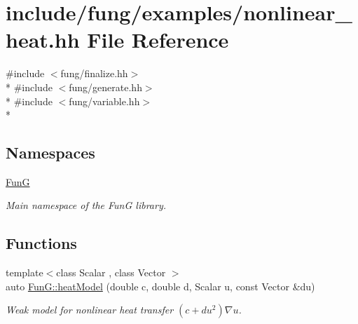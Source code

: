 \hypertarget{nonlinear__heat_8hh}{\section{include/fung/examples/nonlinear\-\_\-heat.hh File Reference}
\label{nonlinear__heat_8hh}
}
{\ttfamily \#include $<$fung/finalize.\-hh$>$}\\*
{\ttfamily \#include $<$fung/generate.\-hh$>$}\\*
{\ttfamily \#include $<$fung/variable.\-hh$>$}\\*
\subsection*{Namespaces}
\begin{DoxyCompactItemize}
\item 
\hyperlink{namespaceFunG}{Fun\-G}
\begin{DoxyCompactList}\small\item\em Main namespace of the Fun\-G library. \end{DoxyCompactList}\end{DoxyCompactItemize}
\subsection*{Functions}
\begin{DoxyCompactItemize}
\item 
{\footnotesize template$<$class Scalar , class Vector $>$ }\\auto \hyperlink{namespaceFunG_aab17a1468e61f58564333b3fcd7900d6}{Fun\-G\-::heat\-Model} (double c, double d, Scalar u, const Vector \&du)
\begin{DoxyCompactList}\small\item\em Weak model for nonlinear heat transfer $ (c+du^2)\nabla u $. \end{DoxyCompactList}\end{DoxyCompactItemize}
